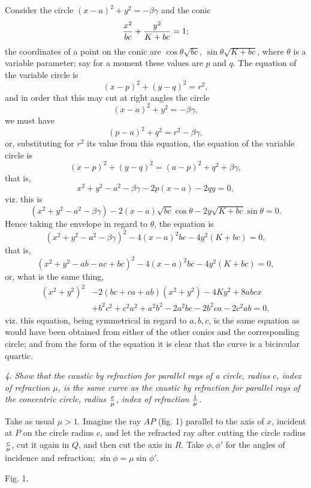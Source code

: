 \documentclass[11pt,a4paper]{article}
\theoremstyle{plain}
\theoremstyle{definition}
\begin{document}
Consider the circle $(x-a)^2+y^2=-\beta\gamma$ and the conic
\[
{x^2\over bc}+{y^2\over K+bc}=1;
\]
the coordinates of a point on the conic are $\cos\theta\sqrt{bc}$, $\sin\theta\sqrt{K+bc}$, where $\theta$ is a variable parameter; say for a moment these values are $p$ and $q$. The equation of the variable circle is
\[
(x-p)^2+(y-q)^2=r^2,
\]
and in order that this may cut at right angles the circle
\[
(x-a)^2+y^2=-\beta\gamma,
\]
we must have
\[
(p-a)^2+q^2=r^2-\beta\gamma,
\]
or, substituting for $r^2$ its value from this equation, the equation of the variable circle is
\[
(x-p)^2+(y-q)^2=(a-p)^2+q^2+\beta\gamma,
\]
that is,
\[
x^2+y^2-a^2-\beta\gamma-2p(x-a)-2qy=0,
\]
viz. this is
\[
(x^2+y^2-a^2-\beta\gamma)-2(x-a)\sqrt{bc}\cos\theta
-2y\sqrt{K+bc}\sin\theta=0.
\]
Hence taking the envelope in regard to $\theta$, the equation is
\[
(x^2+y^2-a^2-\beta\gamma)^2-4(x-a)^2bc-4y^2(K+bc)=0,
\]
that is,
\[
(x^2+y^2-ab-ac+bc)^2-4(x-a)^2bc-4y^2(K+bc)=0,
\]
or, what is the same thing,
\[
\begin{split}
(x^2+y^2)^2&-2(bc+ca+ab)(x^2+y^2)-4Ky^2+8abcx\\
&+b^2c^2+c^2a^2+a^2b^2-2a^2bc-2b^2ca-2c^2ab=0,
\end{split}
\]
viz. this equation, being symmetrical in regard to $a,b,c$, is the same equation as would have been obtained from either of the other conics and the corresponding circle; and from the form of the equation it is clear that the curve is a bicircular quartic.

\newpage

\noindent\textit{4. Show that the caustic by refraction for parallel rays of a circle, radius $c$, index of refraction $\mu$, is the same curve as the caustic by refraction for parallel rays of the concentric circle, radius ${c\over\mu}$, index of refraction ${1\over\mu}$.}

Take as usual $\mu>1$. Imagine the ray $AP$ (fig. 1) parallel to the axis of $x$, incident at $P$ on the circle radius $c$, and let the refracted ray after cutting the circle radius ${c\over\mu}$, cut it again in $Q$, and then cut the axis in $R$. Take $\phi,\phi'$ for the angles of incidence and refraction; $\sin\phi=\mu\sin\phi'$.

\begin{center}
\par Fig. 1.
\end{center}
\end{document}
